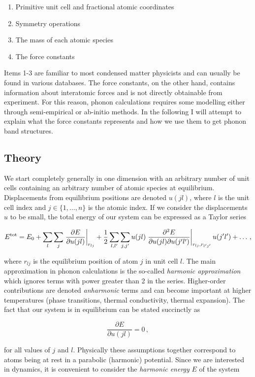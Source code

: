 \begin{enumerate}
	\item Primitive unit cell and fractional atomic coordinates
	\item Symmetry operations
	\item The mass of each atomic species
	\item The force constants
\end{enumerate}

Items 1-3 are familiar to most condensed matter physicists and can usually be found in various databases. The force constants, on the other hand, contains information about interatomic forces and is not directly obtainable from experiment. For this reason, phonon calculations requires some modelling either through semi-empirical or ab-initio methods. In the following I will attempt to explain what the force constants represents and how we use them to get phonon band structures.

\subsection{Theory}

We start completely generally in one dimension with an arbitrary number of unit cells containing an arbitrary number of atomic species at equilibrium. Displacements from equilibrium positions are denoted $u(jl)$, where $l$ is the unit cell index and $j \in \{1,\dots,n\}$ is the atomic index. If we consider the displacements $u$ to be small, the total energy of our system can be expressed as a Taylor series

\[ E^\text{tot} = E_0 + \sum_{l}\sum_{j} \left. \frac{\partial E}{\partial u(jl)} \right\rvert_{r_{lj}}  + \frac{1}{2} \sum_{l,l^\prime} \sum_{j,j^\prime} u(jl) \left. \frac{\partial ^2 E}{\partial u(jl) \partial u(j^\prime l^\prime)} \right\rvert_{r_{lj}, r_{l^\prime j^\prime}} u(j^\prime l^\prime) + \dots \, , \]

\noindent where $r_{lj}$ is the equilibrium position of atom $j$ in unit cell $l$. The main approximation in phonon calculations is the so-called \emph{harmonic approximation} which ignores terms with power greater than 2 in the series. Higher-order contributions are denoted \emph{anharmonic} terms and can become important at higher temperatures (phase transitions, thermal conductivity, thermal expansion). The fact that our system is in equilibrium can be stated succinctly as

\[ \frac{\partial E}{\partial u(jl)} = 0 \, , \]

\noindent for all values of $j$ and $l$. Physically these assumptions together correspond to atoms being at rest in a parabolic (harmonic) potential. Since we are interested in  dynamics, it is convenient to consider the \emph{harmonic energy} $E$ of the system

